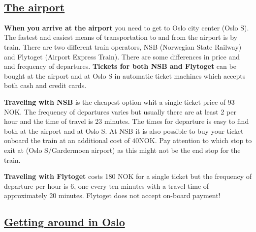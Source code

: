 \documentclass{article}
\begin{document}
\begin{center}
\begin{changemargin}{-1cm}{-1cm}
\end{changemargin}
\end{center}

\clearpage

\
\subsection*{\underline{The airport}}

\textbf{When you arrive at the airport} you need to
get to Oslo city center (Oslo S).
The fastest and easiest means of transportation to and from the airport
is by train. There are two different train operators, NSB
(Norwegian State Railway) and Flytoget (Airport Express Train).
There are some differences in price and
 and frequency of departures.
\textbf{Tickets for both NSB and Flytoget} can be bought at the airport
and at Oslo S in automatic ticket machines which accepts both cash
and credit cards.

\textbf{Traveling with NSB} is the cheapest
option whit a single ticket price
of 93 NOK. The frequency of departures varies but
usually there are at least 2 per hour and the time of travel is 23
 minutes. The times for departure is easy to find
both at the airport and at Oslo S.
At NSB it is also possible to buy your ticket
onboard the train at an additional cost of $40$NOK.
Pay attention to which stop to exit at (Oslo S/Gardermoen airport)
as this might not be the end stop for the train.

\textbf{Traveling with Flytoget} costs 180 NOK for a single ticket
but the frequency of departure per hour is 6, one every
ten minutes with a travel time of approximately 20 minutes.
Flytoget does not accept on-board payment!


\subsection*{\underline{Getting around in Oslo}}
\end{document}
